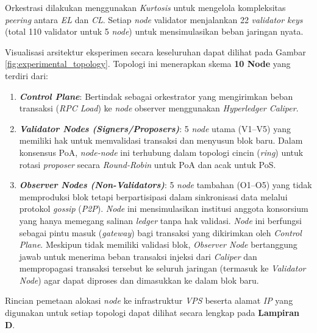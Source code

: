 Orkestrasi dilakukan menggunakan \textit{Kurtosis} untuk mengelola kompleksitas \textit{peering} antara \textit{EL} dan \textit{CL}. Setiap \textit{node} validator menjalankan 22 \textit{validator keys} (total 110 validator untuk 5 \textit{node}) untuk mensimulasikan beban jaringan nyata.

Visualisasi arsitektur eksperimen secara keseluruhan dapat dilihat pada Gambar \ref{fig:experimental_topology}. Topologi ini menerapkan skema \textbf{10 Node} yang terdiri dari:
\begin{enumerate}
    \item \textbf{\textit{Control Plane}}: Bertindak sebagai orkestrator yang mengirimkan beban transaksi (\textit{RPC Load}) ke \textit{node} observer menggunakan \textit{Hyperledger Caliper}.
    \item \textbf{\textit{Validator Nodes (Signers/Proposers)}}: 5 \textit{node} utama (V1--V5) yang memiliki hak untuk memvalidasi transaksi dan menyusun blok baru. Dalam konsensus PoA, \textit{node-node} ini terhubung dalam topologi cincin (\textit{ring}) untuk rotasi \textit{proposer} secara \textit{Round-Robin} untuk PoA dan acak untuk PoS.
    \item \textbf{\textit{Observer Nodes (Non-Validators)}}: 5 \textit{node} tambahan (O1--O5) yang tidak memproduksi blok tetapi berpartisipasi dalam sinkronisasi data melalui protokol \textit{gossip} (\textit{P2P}). \textit{Node} ini mensimulasikan institusi anggota konsorsium yang hanya memegang salinan \textit{ledger} tanpa hak validasi. \textit{Node} ini berfungsi sebagai pintu masuk (\textit{gateway}) bagi transaksi yang dikirimkan oleh \textit{Control Plane}. Meskipun tidak memiliki validasi blok, \textit{Observer Node} bertanggung jawab untuk menerima beban transaksi injeksi dari \textit{Caliper} dan mempropagasi transaksi tersebut ke seluruh jaringan (termasuk ke \textit{Validator Node}) agar dapat diproses dan dimasukkan ke dalam blok baru.
\end{enumerate}

Rincian pemetaan alokasi \textit{node} ke infrastruktur \textit{VPS} beserta alamat \textit{IP} yang digunakan untuk setiap topologi dapat dilihat secara lengkap pada \textbf{Lampiran D}.

